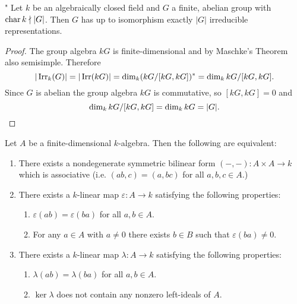\begin{cor}"
 Let $k$ be an algebraically closed field and $G$ a finite, abelian group with $\operatorname{char} k \nmid |G|$. Then $G$ has up to isomorphism exactly $|G|$ irreducible representations.
\end{cor}
\begin{proof}
 The group algebra $kG$ is finite-dimensional and by Maschke’s Theorem also semisimple. Therefore
 \[
  |\operatorname{Irr}_k(G)| = |\operatorname{Irr}(kG)| = \dim_k (kG/[kG, kG])^* = \dim_k kG/[kG, kG].
 \]
 Since $G$ is abelian the group algebra $kG$ is commutative, so $[kG,kG] = 0$ and
 \[
  \dim_k kG/[kG, kG] = \dim_k kG = |G|.
  \qedhere
 \]
\end{proof}


\begin{prop}
 Let $A$ be a finite-dimensional $k$-algebra. Then the following are equivalent:
 \begin{enumerate}[label=\emph{\roman*)}]
  \item\label{enum: nondegenerate symmetric associative bilinear form}
   There exists a nondegenerate symmetric bilinear form $(-,-) \colon A \times A \to k$ which is associative (i.e. $(ab,c) = (a,bc)$ for all $a,b,c \in A$.)
  \item\label{enum: nondegenerato linear map}
   There exists a $k$-linear map $\varepsilon \colon A \to k$ satisfying the following properties:
   \begin{enumerate}[label=\emph{(\roman*)}]
    \item
     $\varepsilon(ab) = \varepsilon(ba)$ for all $a,b \in A$.
    \item
     For any $a \in A$ with $a \neq 0$ there exists $b \in B$ such that $\varepsilon(ba) \neq 0$.
   \end{enumerate}
  \item\label{enum: no nonzero ideals in kernel of linear map}
   There exists a $k$-linear map $\lambda \colon A \to k$ satisfying the following properties:
   \begin{enumerate}[label=\emph{(\roman*)}]
    \item
     $\lambda(ab) = \lambda(ba)$ for all $a,b \in A$.
    \item
     $\ker \lambda$ does not contain any nonzero left-ideals of $A$.
   \end{enumerate}
 \end{enumerate}
\end{prop}
